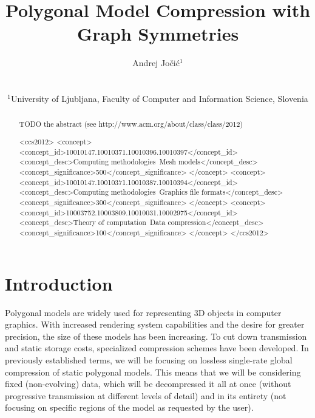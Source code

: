 \documentclass{egpubl}
\title[Polygonal Model Compression]%
      {Polygonal Model Compression with Graph Symmetries}
\author[Andrej Jočić]
{\parbox{\textwidth}{\centering%
        Andrej Jočić$^{1}$ 
        }
        \\
{\parbox{\textwidth}{\centering %
         $^1$University of Ljubljana, Faculty of Computer and Information Science, Slovenia
       }
}
}
\begin{document}

\maketitle
\begin{abstract}

TODO the abstract
   (see http://www.acm.org/about/class/class/2012)
\begin{CCSXML}
    <ccs2012>
    <concept>
    <concept_id>10010147.10010371.10010396.10010397</concept_id>
    <concept_desc>Computing methodologies~Mesh models</concept_desc>
    <concept_significance>500</concept_significance>
    </concept>
    <concept>
    <concept_id>10010147.10010371.10010387.10010394</concept_id>
    <concept_desc>Computing methodologies~Graphics file formats</concept_desc>
    <concept_significance>300</concept_significance>
    </concept>
    <concept>
    <concept_id>10003752.10003809.10010031.10002975</concept_id>
    <concept_desc>Theory of computation~Data compression</concept_desc>
    <concept_significance>100</concept_significance>
    </concept>
</ccs2012>
\end{CCSXML}



\printccsdesc   
\end{abstract}  
\section{Introduction}

Polygonal models are widely used for representing 3D objects in computer graphics. With increased rendering system capabilities and the desire for greater precision, the size of these models has been increasing. To cut down transmission and static storage costs, specialized compression schemes have been developed.
In previously established \cite{meshCompressionSurvey} terms, we will be focusing on lossless single-rate global compression of static polygonal models. This means that we will be considering fixed (non-evolving) data, which will be decompressed it all at once (without progressive transmission at different levels of detail) and in its entirety (not focusing on specific regions of the model as requested by the user).
\end{document}
